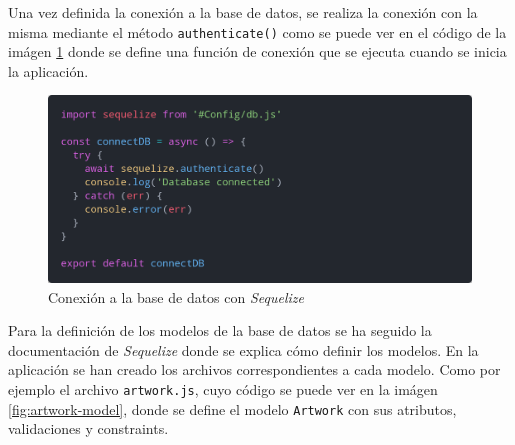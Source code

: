 Una vez definida la conexión a la base de datos, se realiza la conexión con la misma
mediante el método \texttt{authenticate()} como se puede ver en el código de la imágen
\ref{fig:sequelize-connect} donde se define una función de conexión que se ejecuta
cuando se inicia la aplicación.

\begin{figure}[H]
  \centering
  \includegraphics[width=1\textwidth]{img/sequelize-connect}
  \caption{Conexión a la base de datos con \textit{Sequelize}}
  \label{fig:sequelize-connect}
\end{figure}

Para la definición de los modelos de la base de datos se ha seguido la documentación
de \textit{Sequelize} \cite{sequelize-models} donde se explica cómo definir los modelos.
En la aplicación se han creado los archivos correspondientes
a cada modelo. Como por ejemplo el archivo \texttt{artwork.js}, cuyo código se puede ver
en la imágen \ref{fig:artwork-model}, donde se define el modelo \texttt{Artwork} con sus
atributos, validaciones y constraints.

